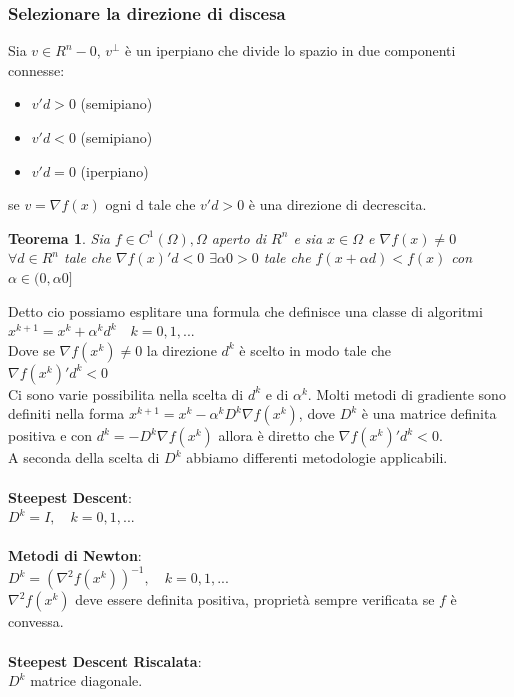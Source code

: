 \documentclass[a4paper, 12pt]{article}
\newtheorem{theorem}{Teorema}
\begin{document}
\subsubsection{Selezionare la direzione di discesa}
Sia $v \in R^n-0$, $v^\perp$ è un iperpiano che divide lo spazio in due componenti connesse:
\begin{itemize}
  \item $v'd > 0$ (semipiano)
  \item $v'd < 0$ (semipiano)
  \item $v'd = 0$ (iperpiano)
\end{itemize}
se $v = \nabla f(x)$ ogni d tale che $v'd > 0$ è una direzione di decrescita.
\begin{theorem}
Sia $f \in C^1(\Omega), \Omega$ aperto di $R^n$ e sia $x \in \Omega$ e $\nabla f(x) \neq 0$ $\forall d \in R^n$ tale che $\nabla f(x)'d < 0$  $\exists \alpha 0 > 0$ tale che $f(x + \alpha d) < f(x)$ con $\alpha \in (0, \alpha0]$
\end{theorem}
Detto cio possiamo esplitare una formula che definisce una classe di algoritmi\\
$x^{k+1} = x^k + \alpha^k d^k \quad k=0, 1, ...$\\
Dove se $\nabla f(x^k) \neq 0$ la direzione $d^k$ è scelto in modo tale che\\
$\nabla f(x^k)'d^k < 0$\\
Ci sono varie possibilita nella scelta di $d^k$ e di $\alpha^k$. Molti metodi di gradiente sono definiti nella forma 
$x^{k+1} = x^k - \alpha^k D^k \nabla f(x^k)$,
dove $D^k$ è una matrice definita positiva e con $d^k = -D^k\nabla f(x^k)$ allora è diretto che $\nabla f(x^k)'d^k < 0$.\\
A seconda della scelta di $D^k$ abbiamo differenti metodologie applicabili.\\\\
\textbf{Steepest Descent}:\\
$D^k = I, \quad k = 0, 1, ...$\\\\
\textbf{Metodi di Newton}:\\
$D^k = (\nabla^2 f(x^k))^{-1}, \quad k = 0, 1, ...$\\
$\nabla^2 f(x^k)$ deve essere definita positiva, proprietà sempre verificata se $f$ è convessa.\\\\
\textbf{Steepest Descent Riscalata}:\\
$D^k$ matrice diagonale.\\\\
\end{document}
